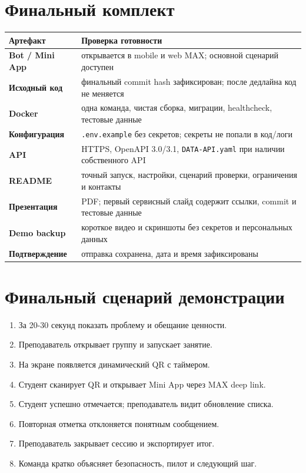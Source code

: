 \documentclass[11pt,a4paper]{article}
\newcommand{\code}[1]{\texttt{#1}}\newcommand{\owner}[1]{\textcolor{MaxPurple}{\textbf{Владелец: #1}}}
\begin{document}
\section{Финальный комплект}
\begin{tabularx}{\textwidth}{>{\bfseries}p{43mm}X}\toprule
Артефакт & Проверка готовности\\\midrule
Bot / Mini App & открывается в mobile и web MAX; основной сценарий доступен\\
Исходный код & финальный commit hash зафиксирован; после дедлайна код не меняется\\
Docker & одна команда, чистая сборка, миграции, healthcheck, тестовые данные\\
Конфигурация & \code{.env.example} без секретов; секреты не попали в код/логи\\
API & HTTPS, OpenAPI 3.0/3.1, \code{DATA-API.yaml} при наличии собственного API\\
README & точный запуск, настройки, сценарий проверки, ограничения и контакты\\
Презентация & PDF; первый сервисный слайд содержит ссылки, commit и тестовые данные\\
Demo backup & короткое видео и скриншоты без секретов и персональных данных\\
Подтверждение & отправка сохранена, дата и время зафиксированы\\\bottomrule
\end{tabularx}

\section{Финальный сценарий демонстрации}
\begin{enumerate}[leftmargin=1.7em,itemsep=0.25em]
  \item За 20-30 секунд показать проблему и обещание ценности.
  \item Преподаватель открывает группу и запускает занятие.
  \item На экране появляется динамический QR с таймером.
  \item Студент сканирует QR и открывает Mini App через MAX deep link.
  \item Студент успешно отмечается; преподаватель видит обновление списка.
  \item Повторная отметка отклоняется понятным сообщением.
  \item Преподаватель закрывает сессию и экспортирует итог.
  \item Команда кратко объясняет безопасность, пилот и следующий шаг.
\end{enumerate}
\end{document}
